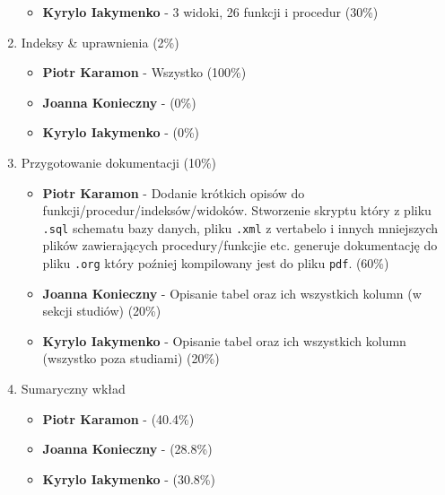 \documentclass[11pt]{article}
\begin{document}
\begin{enumerate}
\begin{itemize}
\item \textbf{Kyrylo Iakymenko} - 3 widoki, 26 funkcji i procedur (30\%)
\end{itemize}
\item Indeksy \& uprawnienia (2\%)
\begin{itemize}
\item \textbf{Piotr Karamon} - Wszystko (100\%)
\item \textbf{Joanna Konieczny} - (0\%)
\item \textbf{Kyrylo Iakymenko} - (0\%)
\end{itemize}
\item Przygotowanie dokumentacji (10\%)
\begin{itemize}
\item \textbf{Piotr Karamon} - Dodanie krótkich opisów do funkcji/procedur/indeksów/widoków. Stworzenie skryptu
który z pliku \texttt{.sql} schematu bazy danych, pliku \texttt{.xml} z vertabelo i innych mniejszych plików zawierających
procedury/funkcjie etc. generuje dokumentację do pliku \texttt{.org} który poźniej kompilowany jest do pliku \texttt{pdf}.
(60\%)
\item \textbf{Joanna Konieczny} - Opisanie tabel oraz ich wszystkich kolumn (w sekcji studiów) (20\%)
\item \textbf{Kyrylo Iakymenko} - Opisanie tabel oraz ich wszystkich kolumn (wszystko poza studiami) (20\%)
\end{itemize}
\item Sumaryczny wkład
\begin{itemize}
\item \textbf{Piotr Karamon}  - (40.4\%)
\item \textbf{Joanna Konieczny} - (28.8\%)
\item \textbf{Kyrylo Iakymenko} - (30.8\%)
\end{itemize}
\end{enumerate}
\end{document}
